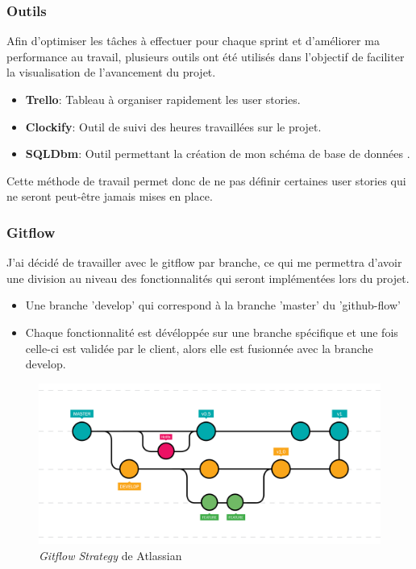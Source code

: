 \subsubsection{Outils}
Afin d'optimiser les tâches à effectuer pour chaque sprint et d'améliorer ma performance au travail, plusieurs outils ont été utilisés dans l'objectif de faciliter la visualisation de l’avancement du projet.
\begin{itemize}
  \item \textbf{Trello}: Tableau à organiser rapidement les user stories.
  \item \textbf{Clockify}: Outil de suivi des heures travaillées sur le projet.
  \item \textbf{SQLDbm}: Outil permettant la création de mon schéma de base de données .
\end{itemize}

Cette méthode de travail permet donc de ne pas définir certaines user stories qui ne seront peut-être jamais mises en place.

\subsubsection{Gitflow}

J'ai décidé de travailler avec le gitflow par branche, ce qui me permettra d'avoir une division au niveau des fonctionnalités qui seront implémentées lors du projet.

\begin{itemize}
  \item Une branche 'develop' qui correspond à la branche 'master' du 'github-flow'
  \item Chaque fonctionnalité est dévéloppée sur une branche spécifique et une fois celle-ci est validée par le client, alors elle est fusionnée avec la branche develop.
\end{itemize}

\begin{figure}[H]
  \centering
  \includegraphics[width=0.75\linewidth]{img/gitflow.png}
  \caption{ \textit{Gitflow Strategy} de Atlassian}
  \label{Gitflow}
\end{figure}


